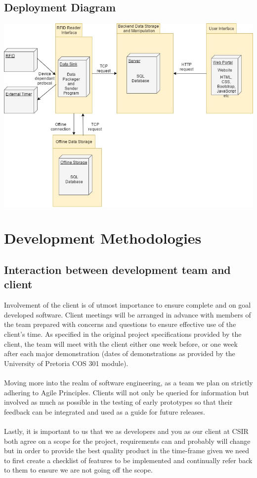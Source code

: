 \documentclass[12pt,a4paper]{article}
\begin{document}
\subsection{Deployment Diagram}
\begin{center}
    \includegraphics[width=0.5\linewidth]{ETADeployment.jpg}
\end{center}

\section{Development Methodologies}
\subsection{Interaction between development team and client}

\textnormal 
Involvement of the client is of utmost importance to ensure complete and on goal developed software. Client meetings will be arranged in advance with members of the team prepared with concerns and questions to ensure effective use of the client's time. 
As specified in the original project specifications provided by the client, the team will meet with the client either one week before, or one week after each major demonstration (dates of demonstrations as provided by the University of Pretoria COS 301 module). 
            \\ \\
            Moving more into the realm of software engineering, as a team we plan on strictly adhering 
            to Agile Principles. Clients will not only be queried for information but involved as much
            as possible in the testing of early prototypes so that their feedback can be integrated and 
            used as a guide for future releases.
            \\ \\
            Lastly, it is important to us that we as developers and you as our client at CSIR both 
            agree on a scope for the project, requirements can and probably will change but in order
            to provide the best quality product in the time-frame given we need to first create a checklist of features to be implemented and continually refer back to them to ensure we are not going off the scope.
                
\end{document}
